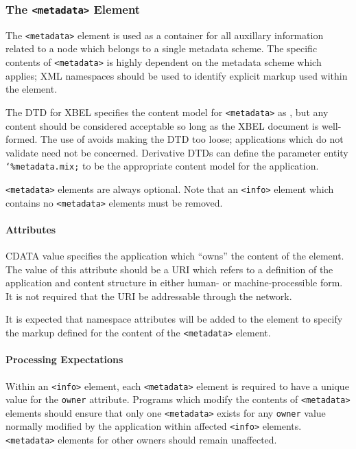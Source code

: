 \documentclass{howto}
\newcommand{\element}[1]{\texttt{<#1>}}
\newcommand{\attribute}[1]{\texttt{#1}}
\newcommand{\paramentity}[1]{\texttt{\char`\%#1;}}
\begin{document}
    \subsubsection{The \element{metadata} Element
                   \label{element-metadata}}

      The \element{metadata} element is used as a container for all
      auxillary information related to a node which belongs to a
      single metadata scheme.  The specific contents of
      \element{metadata} is highly dependent on the metadata scheme
      which applies; XML namespaces should be used to identify
      explicit markup used within the element.

      The DTD for XBEL specifies the content model for
      \element{metadata} as , but any content should be
      considered acceptable so long as the XBEL document is
      well-formed.  The use of  avoids making the DTD too
      loose; applications which do not validate need not be
      concerned.  Derivative DTDs can define the parameter entity
      \paramentity{metadata.mix} to be the appropriate content model
      for the application.

      \element{metadata} elements are always optional.  Note that an
      \element{info} element which contains no \element{metadata}
      elements must be removed.

      \paragraph*{Attributes}
        \begin{definitions}
          \term{\attribute{owner}, \emph{required}}
            CDATA value specifies the application which ``owns'' the
            content of the element.  The value of this attribute
            should be a URI which refers to a definition of the
            application and content structure in either human- or
            machine-processible form.  It is not required that the URI
            be addressable through the network.
	\end{definitions}

        It is expected that namespace attributes will be added to
        the element to specify the markup defined for the content of
        the \element{metadata} element.

      \paragraph*{Processing Expectations}
        Within an \element{info} element, each \element{metadata}
        element is required to have a unique value for the
        \attribute{owner} attribute.  Programs which modify the
        contents of \element{metadata} elements should ensure that
        only one \element{metadata} exists for any \attribute{owner}
        value normally modified by the application within affected
        \element{info} elements.  \element{metadata} elements for
        other owners should remain unaffected.
\end{document}
